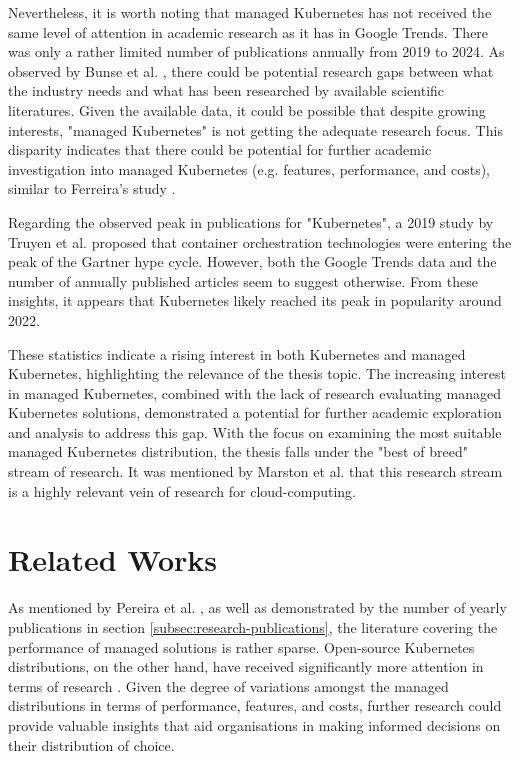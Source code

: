 Nevertheless, it is worth noting that managed Kubernetes has not received the same level of attention in academic research as it has in Google Trends. There was only a rather limited number of publications annually from 2019 to 2024. As observed by Bunse et al. \cite{BUNSE2011667}, there could be potential research gaps between what the industry needs and what has been researched by available scientific literatures. Given the available data, it could be possible that despite growing interests, "managed Kubernetes" is not getting the adequate research focus. This disparity indicates that there could be potential for further academic investigation into managed Kubernetes (e.g. features, performance, and costs), similar to Ferreira’s study \cite{pereiraferreiraPerformanceEvaluationContainers2019}.

Regarding the observed peak in publications for "Kubernetes", a 2019 study by Truyen et al. \cite{truyenComprehensiveFeatureComparison2019} proposed that container orchestration technologies were entering the peak of the Gartner hype cycle. However, both the Google Trends data and the number of annually published articles seem to suggest otherwise. From these insights, it appears that Kubernetes likely reached its peak in popularity around 2022.

These statistics indicate a rising interest in both Kubernetes and managed Kubernetes, highlighting the relevance of the thesis topic. The increasing interest in managed Kubernetes, combined with the lack of research evaluating managed Kubernetes solutions, demonstrated a potential for further academic exploration and analysis to address this gap. With the focus on examining the most suitable managed Kubernetes distribution, the thesis falls under the "best of breed" stream of research. It was mentioned by Marston et al. \cite{MARSTON2011176} that this research stream is a highly relevant vein of research for cloud-computing.

\section{Related Works}

As mentioned by Pereira et al. \cite{pereiraferreiraPerformanceEvaluationContainers2019}, as well as demonstrated by the number of yearly publications in section \ref{subsec:research-publications}, the literature covering the performance of managed solutions is rather sparse. Open-source Kubernetes distributions, on the other hand, have received significantly more attention in terms of research \cite{bohmProfilingLightweightContainer2021,koziolekLightweightKubernetesDistributions2023,ascensaoAssessingKubernetesDistributions2024,9660392,bryantKubernetesDeploymentOptions2024}. Given the degree of variations amongst the managed distributions in terms of performance, features, and costs, further research could provide valuable insights that aid organisations in making informed decisions on their distribution of choice.

